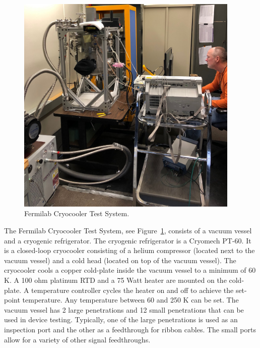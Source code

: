 \label{sec:2.3}
\begin{figure}[htb]
\centering
\begin{center}
\includegraphics[width=0.95\textwidth]{figures/cryotestsystem.jpg}
\end{center}
\caption{Fermilab Cryocooler Test System.}
\label{fig:cryocoolertestsystem}
\end{figure}

The Fermilab Cryocooler Test System, see Figure~\ref{fig:cryocoolertestsystem}, consists of a vacuum vessel and a cryogenic refrigerator. The cryogenic refrigerator is a Cryomech PT-60.  It is a closed-loop cryocooler consisting of a helium compressor (located next to the vacuum vessel) and a cold head (located on top of the vacuum vessel).  The cryocooler cools a copper cold-plate inside the vacuum vessel to a minimum of 60 K.  A 100 ohm platinum RTD and a 75 Watt heater are mounted on the cold-plate.  A temperature controller cycles the heater on and off to achieve the set-point temperature.  Any temperature between 60 and 250 K can be set.
The vacuum vessel has 2 large penetrations and 12 small penetrations that can be used in device testing.  Typically, one of the large penetrations is used as an inspection port and the other as a feedthrough for ribbon cables.  The small ports allow for a variety of other signal feedthroughs.  

